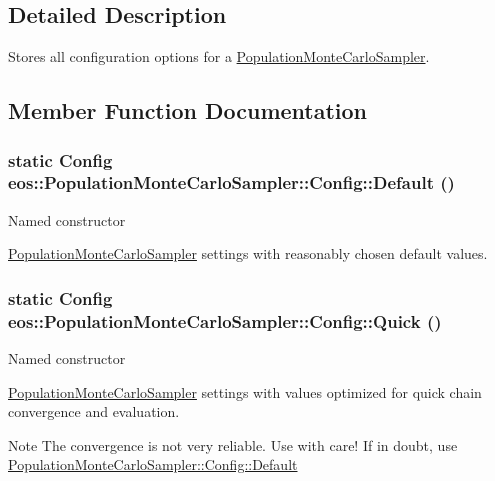 \subsection{Detailed Description}
Stores all configuration options for a \hyperlink{classeos_1_1PopulationMonteCarloSampler}{PopulationMonteCarloSampler}. 

\subsection{Member Function Documentation}
\hypertarget{structeos_1_1PopulationMonteCarloSampler_1_1Config_a8f659cd4c289ebfea73765497eee01dd}{
\subsubsection[{Default}]{\setlength{\rightskip}{0pt plus 5cm}static {\bf Config} eos::PopulationMonteCarloSampler::Config::Default ()}}
\label{structeos_1_1PopulationMonteCarloSampler_1_1Config_a8f659cd4c289ebfea73765497eee01dd}
Named constructor

\hyperlink{classeos_1_1PopulationMonteCarloSampler}{PopulationMonteCarloSampler} settings with reasonably chosen default values. \hypertarget{structeos_1_1PopulationMonteCarloSampler_1_1Config_aa88ccb299ca1bc2881951b82e6e66059}{
\subsubsection[{Quick}]{\setlength{\rightskip}{0pt plus 5cm}static {\bf Config} eos::PopulationMonteCarloSampler::Config::Quick ()}}
\label{structeos_1_1PopulationMonteCarloSampler_1_1Config_aa88ccb299ca1bc2881951b82e6e66059}
Named constructor

\hyperlink{classeos_1_1PopulationMonteCarloSampler}{PopulationMonteCarloSampler} settings with values optimized for quick chain convergence and evaluation.

\begin{DoxyNote}{Note}
The convergence is not very reliable. Use with care! If in doubt, use \hyperlink{structeos_1_1PopulationMonteCarloSampler_1_1Config_a8f659cd4c289ebfea73765497eee01dd}{PopulationMonteCarloSampler::Config::Default} 
\end{DoxyNote}


